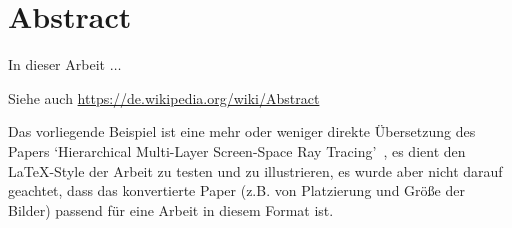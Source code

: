 \chapter*{Abstract}

\bigskip 


In dieser Arbeit $\ldots$

Siehe auch \url{https://de.wikipedia.org/wiki/Abstract}


\bigskip 

Das vorliegende Beispiel ist eine mehr oder weniger direkte Übersetzung des Papers `Hierarchical Multi-Layer Screen-Space Ray Tracing'~\cite{2017_hpg_HBSS}, es dient den \LaTeX-Style der Arbeit zu testen und zu illustrieren, es wurde aber nicht darauf geachtet, dass das konvertierte Paper (z.B. von Platzierung und Größe der Bilder) passend für eine Arbeit in diesem Format ist.

